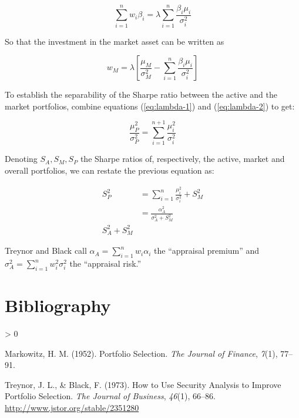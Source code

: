 \documentclass[
  11pt,
]{article}
\newlength{\cslhangindent}
\newenvironment{CSLReferences}[2] %
 {%
  \setlength{\parindent}{0pt}
  \ifodd #1 \everypar{\setlength{\hangindent}{\cslhangindent}}\ignorespaces\fi
  \ifnum #2 > 0
  \setlength{\parskip}{#2\baselineskip}
  \fi
 }%
 {}
\begin{document}
\[
\sum_{i=1}^n w_i \beta_i = \lambda \sum_{i=1}^n \frac{\beta_i \mu_i}{\sigma^2_i}
\]

So that the investment in the market asset can be written as

\[
w_M = \lambda \left[ \frac{\mu_M}{\sigma^2_M} - \sum_{i=1}^n \frac{\beta_i \mu_i}{\sigma^2_i} \right]
\]

To establish the separability of the Sharpe ratio between the active and
the market portfolios, combine equations (\ref{eq:lambda-1}) and
(\ref{eq:lambda-2}) to get:

\[
\frac{\mu^2_P}{\sigma^2_P} = \sum_{i=1}^{n+1} \frac{\mu^2_i}{\sigma^2_i}
\]

Denoting \(S_A, S_M, S_P\) the Sharpe ratios of, respectively, the
active, market and overall portfolios, we can restate the previous
equation as:

\begin{align}
S^2_P &= \sum_{i=1}^{n} \frac{\mu^2_i}{\sigma^2_i} + S^2_M \\
&= \frac{\alpha^2_A}{\sigma^2_A + S^2_M} \\
S^2_A + S^2_M
\end{align}

Treynor and Black call \(\alpha_A = \sum_{i=1}^n w_i \alpha_i\) the
``appraisal premium'' and \(\sigma^2_A = \sum_{i=1}^n w^2_i \sigma^2_i\)
the ``appraisal risk.''

\hypertarget{bibliography}{%
\section*{Bibliography}\label{bibliography}}

\hypertarget{refs}{}
\begin{CSLReferences}{1}{0}
\leavevmode\hypertarget{ref-Markowitz1952}{}%
Markowitz, H. M. (1952). {Portfolio Selection}. \emph{The Journal of
Finance}, \emph{7}(1), 77--91.

\leavevmode\hypertarget{ref-Treynor1973}{}%
Treynor, J. L., \& Black, F. (1973). {How to Use Security Analysis to
Improve Portfolio Selection}. \emph{The Journal of Business},
\emph{46}(1), 66--86. \url{http://www.jstor.org/stable/2351280}

\end{CSLReferences}
\end{document}
